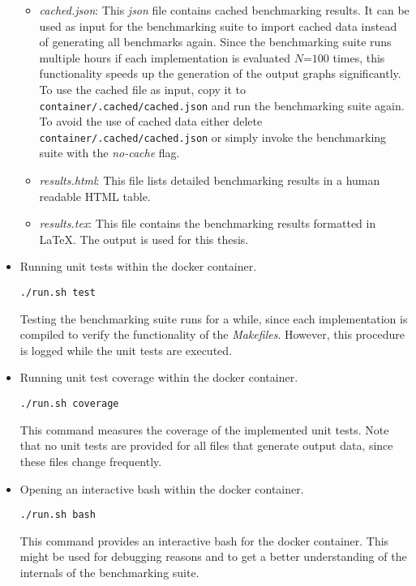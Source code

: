 \begin{itemize}
\begin{itemize}
	\item \textit{cached.json}: This \textit{json} file contains cached benchmarking results. It can be used as input for the benchmarking suite to import cached data instead of generating all benchmarks again. Since the benchmarking suite runs multiple hours if each implementation is evaluated $N$=$100$ times, this functionality speeds up the generation of the output graphs significantly. To use the cached file as input, copy it to \texttt{container/.cached/cached.json} and run the benchmarking suite again. To avoid the use of cached data either delete \texttt{container/.cached/cached.json} or simply invoke the benchmarking suite with the \textit{no-cache} flag.	
	
	\item \textit{results.html}: This file lists detailed benchmarking results in a human readable \gls{HTML} table. 
	
	\item \textit{results.tex}: This file contains the benchmarking results formatted in LaTeX. The output is used for this thesis.
	\end{itemize}

\item Running unit tests within the docker container.
\begin{lstlisting}[numbers=none,linewidth=4cm]
./run.sh test
\end{lstlisting}
Testing the benchmarking suite runs for a while, since each implementation is compiled to verify the functionality of the \textit{Makefiles}. However, this procedure is logged while the unit tests are executed.
	
	
\item Running unit test coverage within the docker container.
\begin{lstlisting}[numbers=none,linewidth=4cm]
./run.sh coverage
\end{lstlisting}
This command measures the coverage of the implemented unit tests. Note that no unit tests are provided for all files that generate output data, since these files change frequently.

\item Opening an interactive bash within the docker container.
\begin{lstlisting}[numbers=none,linewidth=4cm]
./run.sh bash
\end{lstlisting}
This command provides an interactive bash for the docker container. This might be used for debugging reasons and to get a better understanding of the internals of the benchmarking suite.

\end{itemize}